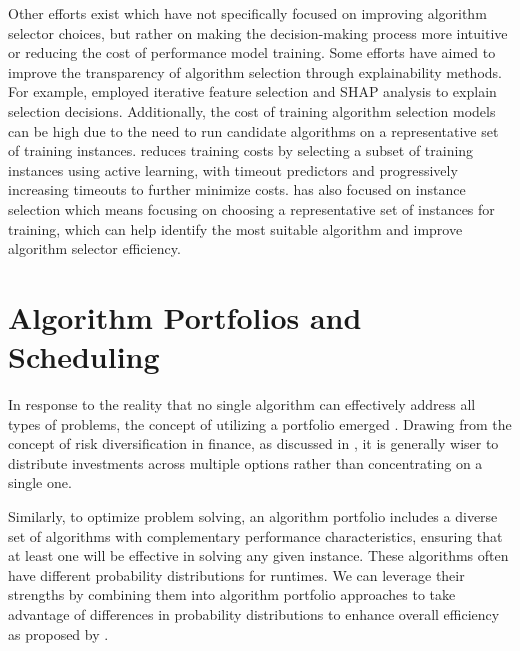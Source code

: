 Other efforts exist which have not specifically focused on improving algorithm selector choices, but rather on making the decision-making process more intuitive or reducing the cost of performance model training. Some efforts have aimed to improve the transparency of algorithm selection through explainability methods. For example, \cite{explainability} employed iterative feature selection and SHAP analysis to explain selection decisions. Additionally, the cost of training algorithm selection models can be high due to the need to run candidate algorithms on a representative set of training instances. \cite{erdem_ku__2024} reduces training costs by selecting a subset of training instances using active learning, with timeout predictors and progressively increasing timeouts to further minimize costs. \cite{brighton2002advances} has also focused on instance selection which means focusing on choosing a representative set of instances for training, which can help identify the most suitable algorithm and improve algorithm selector efficiency. 

\section{Algorithm Portfolios and Scheduling}

In response to the reality that no single algorithm can effectively address all types of problems, the concept of utilizing a portfolio emerged \cite{GOMES200143}. Drawing from the concept of risk diversification in finance, as discussed in \cite{Huberman1997}, it is generally wiser to distribute investments across multiple options rather than concentrating on a single one. 

Similarly, to optimize problem solving, an algorithm portfolio includes a diverse set of algorithms with complementary performance characteristics, ensuring that at least one will be effective in solving any given instance. These algorithms often have different probability distributions for runtimes. We can leverage their strengths by combining them into algorithm portfolio approaches to take advantage of differences in probability distributions to enhance overall efficiency as proposed by \cite{GOMES200143, Gomes1997AlgorithmPD}. 

